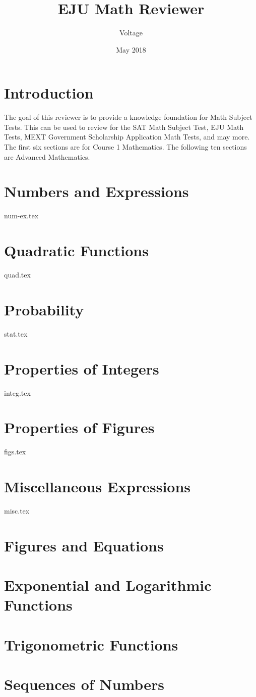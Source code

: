 \documentclass{mext-rev}
\title{EJU Math Reviewer}
\author{Voltage}
\date{May 2018}
\newcommand{\importref}[1]{\label{#1}{#1.tex}}
\begin{document}
\section*{Introduction}
The goal of this reviewer is to provide a knowledge foundation for Math Subject Tests.
This can be used to review for the SAT Math Subject Test, EJU Math Tests, MEXT Government Scholarship Application Math Tests, and may more.
The first six sections are for Course 1 Mathematics.
The following ten sections are Advanced Mathematics.

\section{Numbers and Expressions}\importref{num-ex}
\section{Quadratic Functions}\importref{quad}
\section{Probability}\importref{stat}
\section{Properties of Integers}\importref{integ}
\section{Properties of Figures}\importref{figs}
\section{Miscellaneous Expressions}\importref{misc}
\section{Figures and Equations}\label{fig-eq}\lipsum[2]
\section{Exponential and Logarithmic Functions}\label{expo-log}\lipsum[2]
\section{Trigonometric Functions}\label{trig}\lipsum[2]
\section{Sequences of Numbers}\label{seq}\lipsum[2]
\end{document}
